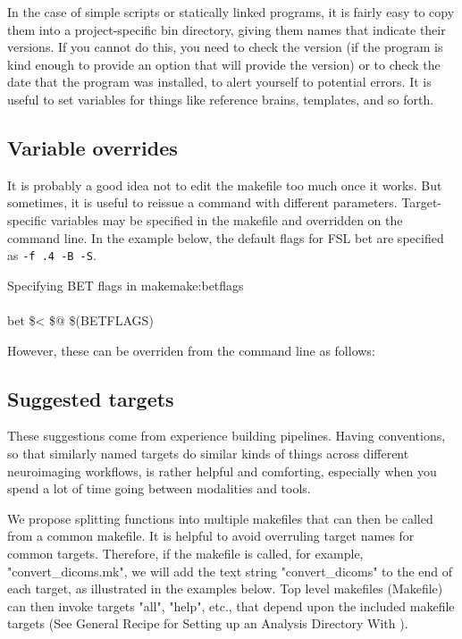 In the case of simple scripts or statically linked programs, it is fairly easy to copy them into a project-specific bin directory, giving them names that indicate their versions. If you cannot do this, you need to check the version (if the program is kind enough to provide an option that will provide the version) or to check the date that the program was installed, to alert yourself to potential errors. It is useful to set variables for things like reference brains, templates, and so forth. 

\subsection{Variable overrides}
It is probably a good idea not to edit the makefile too much once it works. But sometimes, it is useful to reissue a command with different parameters. Target-specific variables may be specified in the makefile and overridden on the command line. In the example below, the default flags for FSL bet are specified as \texttt{-f .4 -B -S}.

\begin{make}{Specifying BET flags in make}{make:betflags}
	 \\
	 \\
	\tab bet \$< \$@ \$(BETFLAGS) \\
\end{make}

However, these can be overriden from the command line as follows:


\subsection{Suggested targets}
These suggestions come from experience building pipelines. Having conventions, so that similarly named targets do similar kinds of things across different neuroimaging workflows, is rather helpful and comforting, especially when you spend a lot of time going between modalities and tools.

We propose splitting functions into multiple makefiles that can then be called from a common makefile. It is helpful to avoid overruling target names for common targets. Therefore, if the makefile is called, for example, "convert_dicoms.mk", we will add the text string "convert_dicoms" to the end of each target, as illustrated in the examples below. Top level makefiles (Makefile) can then invoke targets "all", "help", etc., that depend upon the included makefile targets (See General Recipe for Setting up an Analysis Directory With \maken{}).





